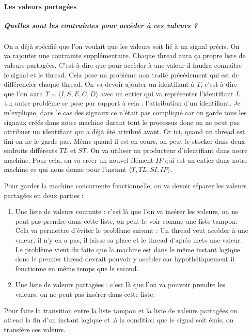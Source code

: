 \documentclass[10pt,a4paper]{report}
\begin{document}
\paragraph{Les valeurs partagées}

\subparagraph{Quelles sont les contraintes pour accèder à ces valeurs ?}
On a déjà spécifié que l'on voulait que les valeurs soit lié à un signal précis. On va rajouter une contrainte supplémentaire. Chaque thread aura ça propre liste de valeurs partagées. C'est-à-dire que pour accèder à une valeur il faudra connaître le signal et le thread. Cela pose un problème non traité précédement qui est de différencier chaque thread. On va devoir ajouter un identifiant à $T$, c'est-à-dire que l'on aura $T = \langle I,S,E,C,D\rangle$ avec un entier qui va représenter l'identifiant $I$. Un autre problème se pose par rapport à cela : l'attribution d'un identifiant.
\smallbreak
Je m'explique, dans le cas des signaux ce n'était pas compliqué car on garde tous les signaux créés dans notre machine durant tout le processus donc on ne peut pas attribuer un identifiant qui a déjà été attribué avant. Or ici, quand un thread est fini on ne le garde pas. Même quand il est en cours, on peut le stocker dans deux endroits différents $TL$ et $ST$. On va utiliser un producteur d'identifiant dans notre machine. Pour cela, on va créer un nouvel élément $IP$ qui est un entier dans notre machine ce qui nous donne pour l'instant $\langle T,TL,SI,IP\rangle$.
\medbreak

Pour garder la machine concurrente fonctionnelle, on va devoir séparer les valeurs partagées en deux parties :
\begin{enumerate}
\item Une liste de valeurs courante : c'est là que l'on va insérer les valeurs, on ne peut pas prendre dans cette liste, on peut le voir comme une liste tampon. Cela va permettre d'éviter le problème suivant : 
  \smallbreak
  Un thread veut accèder à une valeur, il n'y en a pas, il laisse sa place et le thread d'après mets une valeur. Le problème vient du faite que la machine est dans le même instant logique donc le premier thread devrait pouvoir y accèder car hypothétiquement il fonctionne en même temps que le second.
\item Une liste de valeurs partagées : c'est là que l'on va pouvoir prendre les valeurs, on ne peut pas insérer dans cette liste.
\end{enumerate}
\smallbreak
Pour faire la transition entre la liste tampon et la liste de valeurs partagées on attend la fin d'un instant logique et ,à la condition que le signal soit émis, on transfère ces valeurs.
\medbreak
\end{document}
